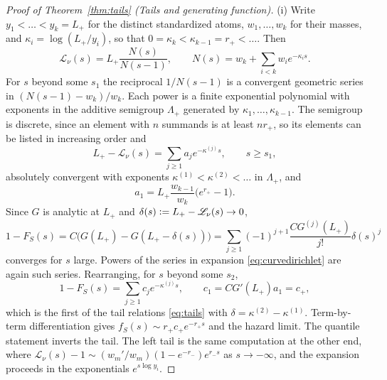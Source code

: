 \documentclass[sn-mathphys-num]{sn-jnl}\newcommand{\SNJNL}{}
\theoremstyle{thmstyleone}
\theoremstyle{thmstyletwo}
\theoremstyle{thmstylethree}
\theoremstyle{thmstyleone}
\providecommand{\Leh}{\mathscr{L}}
\providecommand{\eqdef}{\mathrel{\vcentcolon=}}
\begin{document}
\begin{appendices}
\begin{proof}[Proof of Theorem~\ref{thm:tails} (Tails and generating function)]
			\noindent(i) Write $y_1<\dots<y_k=L_+$ for the distinct standardized atoms,
			$w_1,\dots,w_k$ for their masses, and $\kappa_i=\log(L_+/y_i)$, so
			that $0=\kappa_k<\kappa_{k-1}=r_+<\dots$. Then
			\begin{equation}\label{eq:curveN}
				\Leh_\nu(s)=L_+\frac{N(s)}{N(s-1)},
				\qquad
				N(s)=w_k+\sum_{i<k}w_ie^{-\kappa_is}.
			\end{equation}
			For $s$ beyond some $s_1$ the reciprocal $1/N(s-1)$ is a convergent
			geometric series in $(N(s-1)-w_k)/w_k$. Each power is a finite exponential polynomial with exponents in the
			additive semigroup $\Lambda_+$ generated by $\kappa_1,\dots,\kappa_{k-1}$.
			The semigroup is discrete, since an element with $n$ summands is
			at least $nr_+$, so its elements can be listed in increasing order
			and
			\begin{equation}\label{eq:curvedirichlet}
				L_+-\Leh_\nu(s)=\sum_{j\ge1}a_je^{-\kappa^{(j)}s},
				\qquad s\ge s_1,
			\end{equation}
			absolutely convergent with exponents $\kappa^{(1)}<\kappa^{(2)}<\dots$
			in $\Lambda_+$, and
			\begin{equation}\label{eq:a1}
				a_1=L_+\frac{w_{k-1}}{w_k}\bigl(e^{r_+}-1\bigr).
			\end{equation}
			Since $G$ is analytic at $L_+$ and
			$\delta(s)\eqdef L_+-\Leh_\nu(s)\to0$,
			\begin{equation}\label{eq:tailtaylor}
				1-F_S(s)=C\bigl(G(L_+)-G(L_+-\delta(s))\bigr)
				=\sum_{j\ge1}(-1)^{j+1}\frac{CG^{(j)}(L_+)}{j!}\delta(s)^{j}
			\end{equation}
			converges for $s$ large. Powers of the series
			in expansion \eqref{eq:curvedirichlet} are again such series. Rearranging, for
			$s$ beyond some $s_2$,
			\begin{equation}\label{eq:taildirichlet}
				1-F_S(s)=\sum_{j\ge1}c_je^{-\kappa^{(j)}s},
				\qquad c_1=CG'(L_+)a_1=c_+ ,
			\end{equation}
			which is the first of the tail relations \eqref{eq:tails} with
			$\delta=\kappa^{(2)}-\kappa^{(1)}$. Term-by-term differentiation
			gives $f_S(s)\sim r_+c_+e^{-r_+s}$ and the hazard limit. The
			quantile statement inverts the tail. The left tail is the same
			computation at the other end, where
			$\Leh_\nu(s)-1\sim(w_m'/w_m)(1-e^{-r_-})e^{r_-s}$ as $s\to-\infty$,
			and the expansion proceeds in the exponentials $e^{s\log y_i}$.
			

\end{proof}
\end{appendices}
\end{document}
